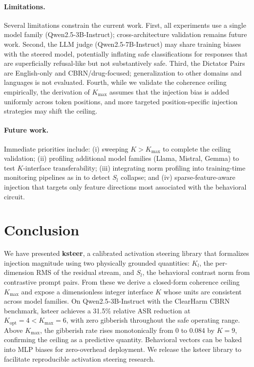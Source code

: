\documentclass[10pt]{article}
\begin{document}
\paragraph{Limitations.}
Several limitations constrain the current work.  First, all experiments use
a single model family (Qwen2.5-3B-Instruct); cross-architecture validation
remains future work.  Second, the LLM judge (Qwen2.5-7B-Instruct) may
share training biases with the steered model, potentially inflating safe
classifications for responses that are superficially refusal-like but not
substantively safe.  Third, the Dictator Pairs are English-only and CBRN/drug-focused;
generalization to other domains and languages is not evaluated.  Fourth, while
we validate the coherence ceiling empirically, the derivation of $K_\text{max}$
assumes that the injection bias is added uniformly across token positions, and
more targeted position-specific injection strategies may shift the ceiling.

\paragraph{Future work.}
Immediate priorities include: (i) sweeping $K > K_\text{max}$ to complete the
ceiling validation; (ii) profiling additional model families (Llama, Mistral,
Gemma) to test $K$-interface transferability; (iii) integrating norm profiling
into training-time monitoring pipelines as in \citet{chen2025persona} to detect
$S_l$ collapse; and (iv) sparse-feature-aware injection \citep{elhage2022toy}
that targets only feature directions most associated with the behavioral circuit.

\section{Conclusion}
\label{sec:conclusion}

We have presented \textbf{ksteer}, a calibrated activation steering library that
formalizes injection magnitude using two physically grounded quantities: $K_l$,
the per-dimension RMS of the residual stream, and $S_l$, the behavioral contrast
norm from contrastive prompt pairs.  From these we derive a closed-form coherence
ceiling $K_\text{max}$ and expose a dimensionless integer interface $K$ whose
units are consistent across model families.  On Qwen2.5-3B-Instruct with the
ClearHarm CBRN benchmark, ksteer achieves a 31.5\% relative ASR reduction at
$K_\text{opt} = 4 < K_\text{max} = 6$, with zero gibberish throughout the safe
operating range.  Above $K_\text{max}$, the gibberish rate rises monotonically
from 0 to 0.084 by $K = 9$, confirming the ceiling as a predictive quantity.
Behavioral vectors can be baked into MLP biases for zero-overhead deployment.
We release the ksteer library to facilitate reproducible activation steering
research.



\end{document}

